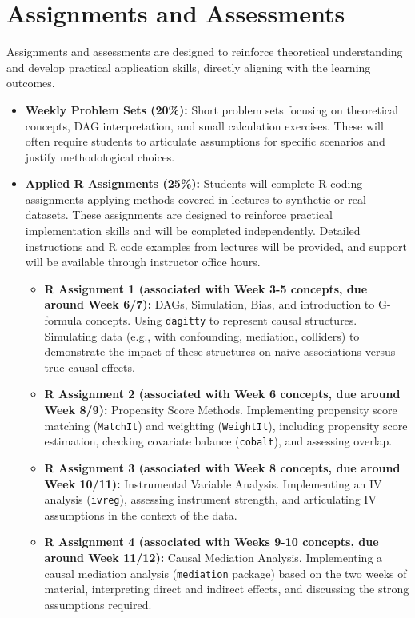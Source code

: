 \documentclass[10.5pt]{article}
\begin{document}
\section{Assignments and Assessments}
Assignments and assessments are designed to reinforce theoretical understanding and develop practical application skills, directly aligning with the learning outcomes.
\begin{itemize}
    \item \textbf{Weekly Problem Sets (20\%):} Short problem sets focusing on theoretical concepts, DAG interpretation, and small calculation exercises. These will often require students to articulate assumptions for specific scenarios and justify methodological choices.
    \item \textbf{Applied R Assignments (25\%):} Students will complete R coding assignments applying methods covered in lectures to synthetic or real datasets. These assignments are designed to reinforce practical implementation skills and will be completed independently. Detailed instructions and R code examples from lectures will be provided, and support will be available through instructor office hours.
    \begin{itemize}
        \item \textbf{R Assignment 1 (associated with Week 3-5 concepts, due around Week 6/7):} DAGs, Simulation, Bias, and introduction to G-formula concepts. Using \texttt{dagitty} to represent causal structures. Simulating data (e.g., with confounding, mediation, colliders) to demonstrate the impact of these structures on naive associations versus true causal effects.
        \item \textbf{R Assignment 2 (associated with Week 6 concepts, due around Week 8/9):} Propensity Score Methods. Implementing propensity score matching (\texttt{MatchIt}) and weighting (\texttt{WeightIt}), including propensity score estimation, checking covariate balance (\texttt{cobalt}), and assessing overlap.
        \item \textbf{R Assignment 3 (associated with Week 8 concepts, due around Week 10/11):} Instrumental Variable Analysis. Implementing an IV analysis (\texttt{ivreg}), assessing instrument strength, and articulating IV assumptions in the context of the data.
        \item \textbf{R Assignment 4 (associated with Weeks 9-10 concepts, due around Week 11/12):} Causal Mediation Analysis. Implementing a causal mediation analysis (\texttt{mediation} package) based on the two weeks of material, interpreting direct and indirect effects, and discussing the strong assumptions required.

\end{itemize}
\end{itemize}
\end{document}
